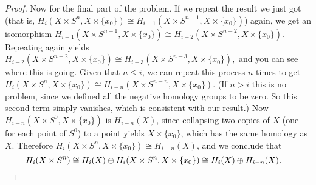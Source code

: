\begin{proof}
Now for the final part of the problem. If we repeat the result we just got (that is, $H_i (X\times S^n , X\times \{x_0\} ) \cong H_{i-1}(X\times S^{n-1}, X\times \{x_0\} )$) again, we get an isomorphism $H_{i-1} (X\times S^{n-1}, X\times \{x_0\} ) \cong H_{i-2}(X\times S^{n-2}, X\times \{x_0\} )$. Repeating again yields $H_{i-2}(X\times S^{n-2},X\times \{x_0\} )\cong H_{i-3}(X\times S^{n-3},X\times \{x_0\} ),$ and you can see where this is going. Given that $n\leq i$, we can repeat this process $n$ times to get $H_i (X\times S^n , X\times \{x_0\} ) \cong H _{i-n}(X\times S^{n-n},X\times \{x_0\} )$. (If $n>i$ this is no problem, since we defined all the negative homology groups to be zero. So this second term simply vanishes, which is consistent with our result.) Now $H_{i-n}(X\times S^0, X\times \{x_0\} )$ is $H_{i-n}(X)$, since collapsing two copies of $X$ (one for each point of $S^0$) to a point yields $X\times \{x_0\} $, which has the same homology as $X$. Therefore $H_i (X\times S^n ,X\times \{x_0\} )\cong H_{i-n}(X)$, and we conclude that \[
    H_i (X\times S^n ) \cong H_i (X)\oplus H_i (X\times S^n , X\times \{x_0\} )\cong H_i (X)\oplus H_{i-n}(X).\quad \qedhere
\] \end{proof}
